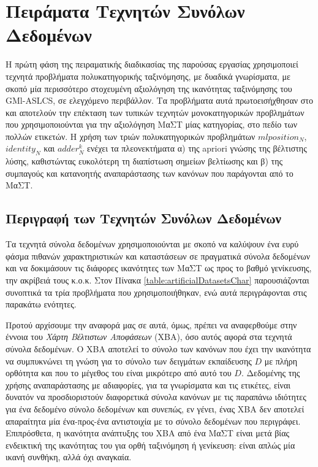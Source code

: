 \chapter{Πειράματα Τεχνητών Συνόλων Δεδομένων}
\label{testBedsExperiments}
Η πρώτη φάση της πειραματικής διαδικασίας της παρούσας εργασίας χρησιμοποιεί τεχνητά προβλήματα πολυκατηγορικής ταξινόμησης, με δυαδικά γνωρίσματα, με σκοπό μία περισσότερο στοχευμένη αξιολόγηση της ικανότητας ταξινόμησης του GMl-ASLCS, σε ελεγχόμενο περιβάλλον. Τα προβλήματα αυτά πρωτοεισήχθησαν στο \cite{allamanis11} και αποτελούν την επέκταση των τυπικών τεχνητών μονοκατηγορικών προβλημάτων που χρησιμοποιούνται για την αξιολόγηση ΜαΣΤ μίας κατηγορίας, στο πεδίο των πολλών ετικετών. Η χρήση των τριών πολυκατηγορικών προβλημάτων $mlposition_{N}$, $identity_{N}$ και $adder^{k}_{N}$ ενέχει τα πλεονεκτήματα α) της apriori γνώσης της βέλτιστης λύσης, καθιστώντας ευκολότερη τη διαπίστωση σημείων βελτίωσης και β) της συμπαγούς και κατανοητής αναπαράστασης των κανόνων που παράγονται από το ΜαΣΤ.

\section{Περιγραφή των Τεχνητών Συνόλων Δεδομένων} 
Τα τεχνητά σύνολα δεδομένων χρησιμοποιούνται με σκοπό να καλύψουν ένα ευρύ φάσμα πιθανών χαρακτηριστικών και καταστάσεων σε πραγματικά σύνολα δεδομένων και να δοκιμάσουν τις διάφορες ικανότητες των ΜαΣΤ ως προς το βαθμό γενίκευσης, την ακρίβειά τους κ.ο.κ. Στον Πίνακα \ref{table:artificialDatasetsChar} παρουσιάζονται συνοπτικά τα τρία προβλήματα που χρησιμοποιήθηκαν, ενώ αυτά περιγράφονται στις παρακάτω ενότητες.

Προτού αρχίσουμε την αναφορά μας σε αυτά, όμως, πρέπει να αναφερθούμε στην έννοια του \emph{Χάρτη Βέλτιστων Αποφάσεων} (ΧΒΑ), όσο αυτός αφορά στα τεχνητά σύνολα δεδομένων. Ο ΧΒΑ αποτελεί το σύνολο των κανόνων που έχει την ικανότητα να συμπυκνώνει τη γνώση για το σύνολο των δειγμάτων εκπαίδευσης $D$ με πλήρη ορθότητα και που το μέγεθος του είναι μικρότερο από αυτό του $D$. Δεδομένης της χρήσης αναπαράστασης με αδιαφορίες, για τα γνωρίσματα και τις ετικέτες, είναι δυνατόν να προσδιοριστούν διαφορετικά σύνολα κανόνων με τις παραπάνω ιδιότητες για ένα δεδομένο σύνολο δεδομένων και συνεπώς, εν γένει, ένας ΧΒΑ δεν αποτελεί απαραίτητα μία ένα-προς-ένα αντιστοιχία με το σύνολο δεδομένων που περιγράφει. Επιπρόσθετα, η ικανότητα ανάπτυξης του ΧΒΑ από ένα ΜαΣΤ είναι μετά βίας ενδεικτική της ικανότητας του για ορθή ταξινόμηση ή γενίκευση: είναι απλώς μία ικανή συνθήκη, αλλά όχι αναγκαία.

